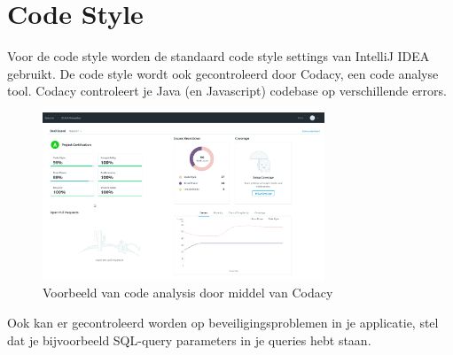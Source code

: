 \chapter{Code Style}
Voor de code style worden de standaard code style settings van IntelliJ IDEA gebruikt.
De code style wordt ook gecontroleerd door Codacy, een code analyse tool.
Codacy controleert je Java (en Javascript) codebase op verschillende errors.

\begin{figure}[H]
	\includegraphics[width=0.75\textwidth]{images/StaticCodeAnalysis.png}
	\caption{Voorbeeld van code analysis door middel van Codacy}
	\label{fig:StaticCodeAnalyses}
\end{figure}

Ook kan er gecontroleerd worden op beveiligingsproblemen in je applicatie, stel dat je bijvoorbeeld SQL-query parameters in je queries hebt staan.

